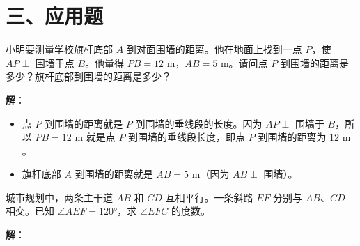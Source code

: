 \documentclass[12pt, a4paper]{ctexart}
\begin{document}
\section*{\textcolor{apppurple}{三、应用题}}

\begin{appbox}[【应用1】测量中的垂直与距离]
小明要测量学校旗杆底部 $A$ 到对面围墙的距离。他在地面上找到一点 $P$，使 $AP \perp$ 围墙于点 $B$。他量得 $PB = 12\text{ m}$，$AB = 5\text{ m}$。请问点 $P$ 到围墙的距离是多少？旗杆底部到围墙的距离是多少？
\end{appbox}

\textbf{解}：

\begin{itemize}[leftmargin=2em]
  \item 点 $P$ 到围墙的距离就是 $P$ 到围墙的垂线段的长度。因为 $AP \perp$ 围墙于 $B$，所以 $PB = 12\text{ m}$ 就是点 $P$ 到围墙的垂线段长度，即点 $P$ 到围墙的距离为 $\boxed{12\text{ m}}$。
  \item 旗杆底部 $A$ 到围墙的距离就是 $AB = 5\text{ m}$（因为 $AB \perp$ 围墙）。
\end{itemize}

\vspace{6pt}

\begin{appbox}[【应用2】平行线在道路设计中的应用]
城市规划中，两条主干道 $AB$ 和 $CD$ 互相平行。一条斜路 $EF$ 分别与 $AB$、$CD$ 相交。已知 $\angle AEF = 120°$，求 $\angle EFC$ 的度数。
\end{appbox}

\begin{center}
\end{center}

\textbf{解}：
\end{document}

